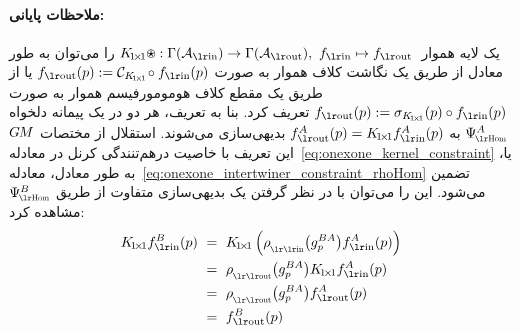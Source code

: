 \paragraph{ملاحظات پایانی:}
یک لایه هموار\onexoneGMfarsi\
$K_{\!1\!\times\!1} \ostar: \Gamma(\Ain)\to \Gamma(\Aout),\ \fin\mapsto \fout$ را می‌توان به طور معادل از طریق یک نگاشت کلاف هموار به صورت $\fout(p) := \mathcal{C}_{K_{\!1\!\times\!1}} \!\circ \fin(p)$ یا از طریق یک مقطع کلاف هومومورفیسم هموار به صورت $\fout(p) := \sigma_{K_{\!1\!\times\!1}}(p) \circ \fin(p)$ تعریف کرد.
بنا به تعریف، هر دو در یک پیمانه دلخواه $\PsiHom^A$ به $\fout^A(p) = K_{\!1\!\times\!1} \fin^A(p)$ بدیهی‌سازی می‌شوند.
استقلال از مختصات $G\mkern-1.4muM$ این تعریف با خاصیت درهم‌تنندگی کرنل در معادله~\eqref{eq:onexone_kernel_constraint} یا، به طور معادل، معادله~\eqref{eq:onexone_intertwiner_constraint_rhoHom} تضمین می‌شود.
این را می‌توان با در نظر گرفتن یک بدیهی‌سازی متفاوت از طریق $\PsiHom^B$ مشاهده کرد:
\begin{align}
    K_{\!1\!\times\!1} \fin^B(p)
    \ &=\ K_{\!1\!\times\!1} \left( \rhoin\big(g^{BA}_p\big) \fin^A(p) \right) \notag \\
    \ &=\ \rhoout\big(g^{BA}_p\big) K_{\!1\!\times\!1} \fin^A(p) \notag \\
    \ &=\ \rhoout\big(g^{BA}_p\big) \fout^A(p) \notag \\
    \ &=\ \fout^B(p)
\end{align}
